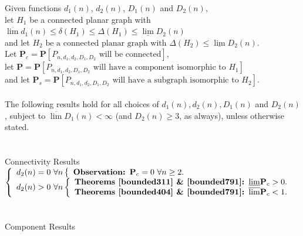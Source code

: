 \documentclass{article}
\newtheorem{Proof of Theorem}{Proof of Theorem}
\begin{document}
Given functions $d_{1}(n)$, $d_{2}(n)$, $D_{1}(n)$ and $D_{2}(n)$, \\
let $H_{1}$ be a connected planar graph with 
$\overline{\lim} d_{1}(n) \leq \delta(H_{1}) \leq \Delta(H_{1}) \leq \underline{\lim} D_{2}(n)$ \\
and let $H_{2} \textrm{ be a connected planar graph with } 
\Delta(H_{2}) \leq \underline{\lim} D_{2}(n)$. \\
Let $\mathbf{P}_{c} = \mathbf{P}[P_{n,d_{1},d_{2},D_{1},D_{2}} \textrm{ will be connected}]$, \\
let $\mathbf{P} = 
\mathbf{P}[P_{n,d_{1},d_{2},D_{1},D_{2}} \textrm{ will have a component isomorphic to } H_{1}]$ \\
and let $\mathbf{P}_{s} = \mathbf{P}[P_{n,d_{1},d_{2},D_{1},D_{2}} \textrm{ will have a subgraph isomorphic to } H_{2}]$.
\\
\\
The following results hold for all choices of $d_{1}(n),d_{2}(n),D_{1}(n)$ and $D_{2}(n)$, 
subject to $\overline{\lim} D_{1}(n) < \infty$ (and $D_{2}(n) \geq 3$, as always), 
unless otherwise stated.
\\
\\
\\
Connectivity Results
$\left\{ \begin{array}{l}
d_{2}(n)=0~\forall n
\left\{ \begin{array}{l} 
\textrm{\textbf{Observation: }} \textbf{P}_{c}=0 \textrm{ } \forall n \geq 2.
\end{array} \right. \\
d_{2}(n)>0~\forall n
\left\{ \begin{array}{l}
\textrm{\textbf{Theorems~\ref{bounded311} \&~\ref{bounded791}: }}
\underline{\lim} \mathbf{P}_{c} >0. \\
\textrm{\textbf{Theorems~\ref{bounded404} \&~\ref{bounded791}: }}
\overline{\lim} \mathbf{P}_{c} <1. \\
\end{array} \right.
\end{array} \right.$ \\
\\
\\
Component Results
\end{document}

